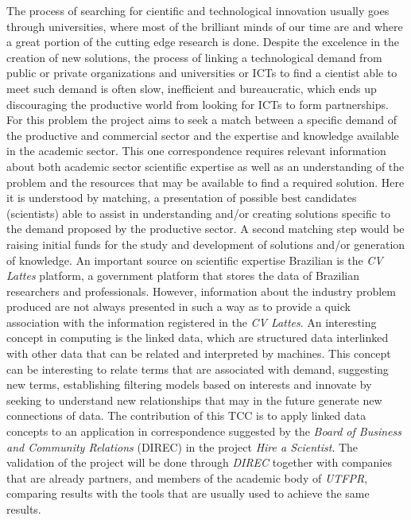 \begin{abstractutfpr}
    The process of searching for cientific and technological innovation usually goes through universities, where most of the brilliant minds of our time are and where a great portion of the cutting edge research is done. Despite the excelence in the creation of new solutions, the process of linking a technological demand from public or private organizations and universities or ICTs to find a cientist able to meet such demand is often slow, inefficient and bureaucratic, which ends up discouraging the productive world from looking for ICTs to form partnerships. For this problem the project aims to seek a match between a specific demand of the productive and commercial sector and the expertise and knowledge available in the academic sector. This one correspondence requires relevant information about both academic sector scientific expertise as well as an understanding of the problem and the resources that may be available to find a required solution. Here it is understood by matching, a presentation of possible best candidates (scientists) able to assist in understanding and/or creating solutions specific to the demand proposed by the productive sector. A second matching step would be raising initial funds for the study and development of solutions and/or generation of knowledge. An important source on scientific expertise Brazilian is the \emph{CV Lattes} platform, a government platform that stores the data of Brazilian researchers and professionals. However, information about the industry problem produced are not always presented in such a way as to provide a quick association with the information registered in the \emph{CV Lattes}.
    An interesting concept in computing is the linked data, which are structured data interlinked with other data that can be related and interpreted by machines. This concept can be interesting to relate terms that are associated with demand, suggesting new terms, establishing filtering models based on interests and innovate by seeking to understand new relationships that may in the future generate new connections of data. The contribution of this TCC is to apply linked data concepts to an application in correspondence suggested by the \emph{Board of Business and Community Relations} (DIREC) in the project \emph{Hire a Scientist}. The validation of the project will be done through \emph{DIREC} together with companies that are already partners, and members of the academic body of \emph{UTFPR}, comparing results with the tools that are usually used to achieve the same results.
\end{abstractutfpr}
